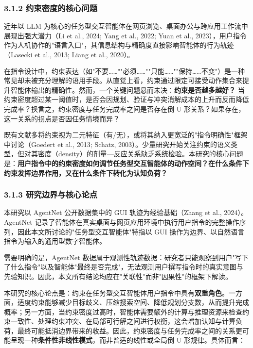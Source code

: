 \documentclass[12pt,a4paper,openany,oneside]{ctexrep}
\begin{document}
\subsubsection{3.1.2 约束密度的核心问题}


近年以 LLM 为核心的任务型交互智能体在网页浏览、桌面办公与跨应用工作流中展现出强大潜力（Li et al., 2024; Yang et al., 2022; Yuan et al., 2023），用户指令作为人机协作的"语言入口"，其信息结构与精确度直接影响智能体的行为轨迹（Lasecki et al., 2013; Liang et al., 2020）。

在指令设计中，约束表达（如"不要……""必须……""只能……""保持……不变"）是一种常见却未被充分理解的语用手段。从直觉上看，约束通过限定可接受动作集合来提升智能体输出的精确性。然而，一个关键问题悬而未决：\textbf{约束是否越多越好？} 当约束密度超过某一阈值时，是否会因规划、验证与冲突消解成本的上升而反而降低完成率？换言之，约束密度与任务完成率之间是否存在倒 U 形关系？如果存在，这一关系的拐点是否因任务情境而异？

既有文献多将约束视为二元特征（有/无），或将其纳入更宽泛的"指令明确性"框架中讨论（Goedert et al., 2013; Schatz, 2003）。少量研究开始关注约束的语义类型，但对其密度（density）的剂量—反应关系缺乏系统检验。本研究的核心问题是：\textbf{用户指令中的约束密度如何调节任务型交互智能体的动作空间？在什么条件下约束发挥边界作用，又在什么条件下转化为认知负荷？}

\subsubsection{3.1.3 研究边界与核心论点}


本研究以 AgentNet 公开数据集中的 GUI 轨迹为经验基础（Zhang et al., 2024）。AgentNet 记录了智能体在真实桌面与网页应用环境中执行用户指令的完整操作序列，因此本文所讨论的"任务型交互智能体"特指以 GUI 操作为边界、以自然语言指令为输入的通用型数字智能体。

需要明确的是，AgentNet 数据属于观测性轨迹数据：研究者只能观察到用户"写下了什么指令"以及智能体"最终是否完成"，无法观测用户撰写指令时的真实意图与先验知识。因此，本文所有结论均应在"关联性"而非"因果性"的框架下解读。

本研究的核心论点是：约束在任务型交互智能体用户指令中具有\textbf{双重角色}。一方面，适度约束能够减少目标歧义、压缩搜索空间、降低规划分支数，从而提升完成概率；另一方面，当约束密度过高时，智能体需要额外的计算与推理资源来检查约束一致性、处理约束冲突、在局部可行解之间进行权衡，这会增加认知与计算负荷，最终可能抵消边界带来的收益。因此，约束密度与任务完成率之间的关系更可能呈现一种\textbf{条件性非线性模式}，而非普适的线性或全局倒 U 形规律。具体而言：
\end{document}
